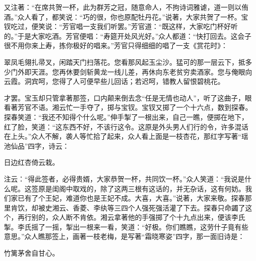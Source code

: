 \begin{parag}
    又注著：“在席共贺一杯，此为群芳之冠，随意命人，不拘诗词雅谑，道一则以侑酒。”众人看了，都笑说：“巧的很，你也原配牡丹花。”说著，大家共贺了一杯。宝钗吃过，便笑说：“芳官唱一支我们听罢。”芳官道：“既这样，大家吃门杯好听的。”于是大家吃酒。芳官便唱：“寿筵开处风光好。”众人都道：“快打回去。这会子很不用你来上寿，拣你极好的唱来。”芳官只得细细的唱了一支《赏花时》：
\end{parag}

\begin{qute2sp}

    翠凤毛翎扎帚叉，闲踏天门扫落花。您看那风起玉尘沙。猛可的那一层云下，抵多少门外即天涯。您再休要剑斩黄龙一线儿差，再休向东老贫穷卖酒家。您与俺眼向云霞。洞宾呵，您得了人可便早些儿回话；若迟呵，错教人留恨碧桃花。
\end{qute2sp}

\begin{parag}
    才罢。宝玉却只管拿著那签，口内颠来倒去念“任是无情也动人”，听了这曲子，眼看著芳官不语。湘云忙一手夺了，掷与宝钗。宝钗又掷了一个十六点，数到探春。探春笑道：“我还不知得个什么呢。”伸手掣了一根出来，自己一瞧，便掷在地下，红了脸，笑道：“这东西不好，不该行这令。这原是外头男人们行的令，许多混话在上头。”众人不解，袭人等忙拾了起来，众人看上面是一枝杏花，那红字写著“瑶池仙品”四字，诗云：
\end{parag}
\begin{poem}
    \begin{pl}
        日边红杏倚云栽。
    \end{pl}

\end{poem}

\begin{parag}
    注云：“得此签者，必得贵婿，大家恭贺一杯，共同饮一杯。”众人笑道：“我说是什么呢。这签原是闺阁中取戏的，除了这两三根有这话的，并无杂话，这有何妨。我们家已有了个王妃，难道你也是王妃不成。大喜，大喜。”说著，大家来敬。探春那里肯饮，却被史湘云、香菱、李纨等三四个人强死强活灌了下去。探春只命蠲了这个，再行别的，众人断不肯依。湘云拿著他的手强掷了个十九点出来，便该李氏掣。李氏摇了一摇，掣出一根来一看，笑道：“好极。你们瞧瞧，这劳什子竟有些意思。”众人瞧那签上，画著一枝老梅，是写著“霜晓寒姿”四字，那一面旧诗是：
\end{parag}
\begin{poem}
    \begin{pl}
        竹篱茅舍自甘心。

    \end{pl}

\end{poem}

